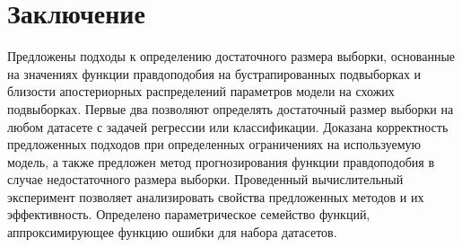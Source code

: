 \section{Заключение}

Предложены подходы к определению достаточного размера выборки, основанные на значениях функции правдоподобия на бустрапированных подвыборках и близости апостериорных распределений параметров модели на схожих подвыборках. Первые два позволяют определять достаточный размер выборки на любом датасете с задачей регрессии или классификации. Доказана корректность предложенных подходов при определенных ограничениях на используемую модель, а также предложен метод прогнозирования функции правдоподобия в случае недостаточного размера выборки. Проведенный вычислительный эксперимент позволяет анализировать свойства предложенных методов и их эффективность. Определено параметрическое семейство функций, аппроксимирующее функцию ошибки для набора датасетов. 